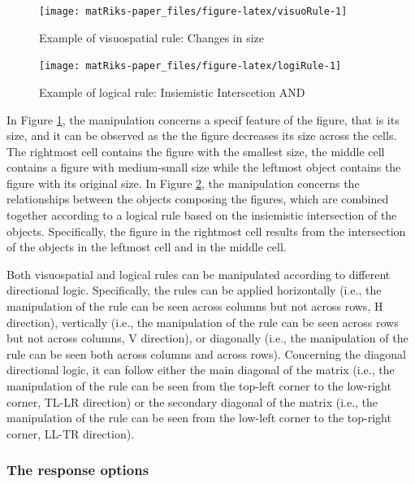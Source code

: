 \begin{figure}

{\centering \texttt{[image: matRiks-paper\_files/figure-latex/visuoRule-1]} 

}

\caption{Example of visuospatial rule: Changes in size}\label{fig:visuoRule}
\end{figure}

\begin{figure}

{\centering \texttt{[image: matRiks-paper\_files/figure-latex/logiRule-1]} 

}

\caption{Example of logical rule: Insiemistic Interscetion AND}\label{fig:logiRule}
\end{figure}

In Figure \ref{fig:visuoRule}, the manipulation concerns a specif feature of the figure, that is its size, and it can be observed as the the figure decreases its size across the cells.
The rightmost cell contains the figure with the smallest size, the middle cell contains a figure with medium-small size while the leftmost object contains the figure with its original size.
In Figure \ref{fig:logiRule}, the manipulation concerns the relationships between the objects composing the figures, which are combined together according to a logical rule based on the insiemistic intersection of the objects. Specifically, the figure in the rightmost cell results from the intersection of the objects in the leftmost cell and in the middle cell.

Both visuospatial and logical rules can be manipulated according to different directional logic.
Specifically, the rules can be applied horizontally (i.e., the manipulation of the rule can be seen across columns but not across rows, H direction), vertically (i.e., the manipulation of the rule can be seen across rows but not across columns, V direction), or diagonally (i.e., the manipulation of the rule can be seen both across columns and across rows). Concerning the diagonal directional logic, it can follow either the main diagonal of the matrix (i.e., the manipulation of the rule can be seen from the top-left corner to the low-right corner, TL-LR direction) or the secondary diagonal of the matrix (i.e., the manipulation of the rule can be seen from the low-left corner to the top-right corner, LL-TR direction).

\subsubsection{The response options}\label{the-response-options}

